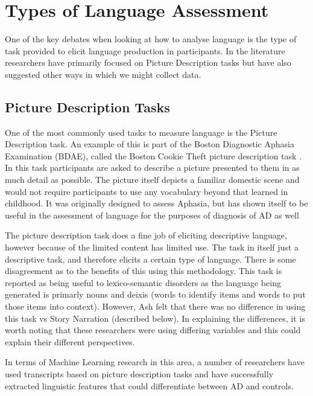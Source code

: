 \documentclass[a4paper]{article}
\begin{document}
\section {Types of Language Assessment}
One of the key debates when looking at how to analyse language is the type of task provided to elicit language production in participants. In the literature researchers have primarily focused on Picture Description tasks but have also suggested other ways in which we might collect data. \newline
\par
\subsection{Picture Description Tasks}
One of the most commonly used tasks to measure language is the Picture Description task. An example of this is part of the Boston Diagnostic Aphasia Examination (BDAE), called the Boston Cookie Theft picture description task \cite{Kaplan2010}. In this task participants are asked to describe a picture presented to them in as much detail as possible. The picture itself depicts a familiar domestic scene and would not require participants to use any vocabulary beyond that learned in childhood. It was originally designed to assess Aphasia, but has shown itself to be useful in the assessment of language for the purposes of diagnosis of AD as well \cite{Giles1996}\newline
\par
The picture description task does a fine job of eliciting descriptive language, however because of the limited content has limited use. The task in itself just a descriptive task, and therefore elicits a certain type of language. There is some disagreement as to the benefits of this using this methodology. This task is reported as being useful to lexico-semantic disorders \cite{Boschi2017, Sajjadi2012} as the language being generated is primarly nouns and deixis (words to identify items and words to put those items into context). However, Ash \cite{Ash2012}felt that there was no difference in using this task vs Story Narration (described below). In explaining the differences, it is worth noting that these researchers were using differing variables and this could explain their different perspectives. \newline
\par
In terms of Machine Learning research in this area, a number of researchers have used transcripts based on picture description tasks \cite{Orimaye2017, Konig2018, Mueller2018a, Fraser2015} and have successfully extracted linguistic features that could differentiate between AD and controls.\newline
\par
\end{document}

